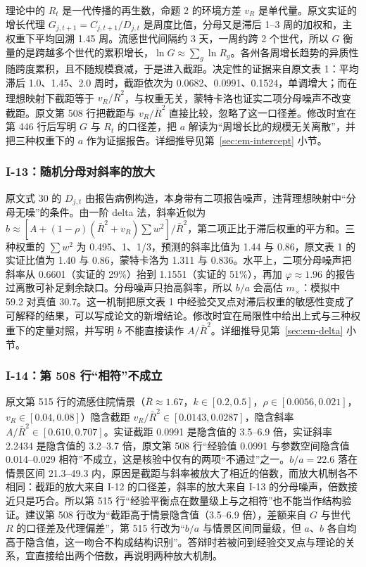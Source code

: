 理论中的 $R_t$ 是一代传播的再生数，命题 2 的环境方差 $v_R$ 是单代量。原文实证的增长代理 $G_{j,t+1}=C_{j,t+1}/\allowbreak D_{j,t}$ 是周度比值，分母又是滞后 1--3 周的加权和，主权重下平均回溯 1.45 周。流感世代间隔约 3 天，一周约跨 2 个世代，所以 $G$ 衡量的是跨越多个世代的累积增长，$\ln G\approx\sum_g\ln R_g$。各州各周增长趋势的异质性随跨度累积，且不随规模衰减，于是进入截距。决定性的证据来自原文表 1：平均滞后 1.0、1.45、2.0 周时，截距依次为 0.0682、0.0991、0.1524，单调增大；而在理想映射下截距等于 $v_R/\bar R^2$，与权重无关，蒙特卡洛也证实二项分母噪声不改变截距。原文第 508 行把截距与 $v_R/\bar R^2$ 直接比较，忽略了这一口径差。修改时宜在第 446 行后写明 $G$ 与 $R_t$ 的口径差，把 $a$ 解读为“周增长比的规模无关离散”，并把三种权重下的 $a$ 作为证据报告。详细推导见第~\ref{sec:em-intercept} 小节。

\subsubsection{I-13：随机分母对斜率的放大}

原文式 30 的 $D_{j,t}$ 由报告病例构造，本身带有二项报告噪声，违背理想映射中“分母无噪”的条件。由一阶 delta 法，斜率近似为 $b\approx[A+(1-\rho)(\bar R^2+v_R)\sum w^2]/\bar R^2$，第二项正比于滞后权重的平方和。三种权重的 $\sum w^2$ 为 0.495、1、1/3，预测的斜率比值为 1.44 与 0.86，原文表 1 的实证比值为 1.40 与 0.86，蒙特卡洛为 1.311 与 0.836。水平上，二项分母噪声把斜率从 0.6601（实证的 29\%）抬到 1.1551（实证的 51\%），再加 $\varphi\approx1.96$ 的报告过离散可补足剩余缺口。分母噪声只抬高斜率，所以 $b/a$ 会高估 $m_\times$：模拟中 59.2 对真值 30.7。这一机制把原文表 1 中经验交叉点对滞后权重的敏感性变成了可解释的结果，可以写成论文的新增结论。修改时宜在局限性中给出上式与三种权重下的定量对照，并写明 $b$ 不能直接读作 $A/\bar R^2$。详细推导见第~\ref{sec:em-delta} 小节。

\subsubsection{I-14：第 508 行“相符”不成立}

原文第 515 行的流感住院情景（$\bar R\approx1.67$，$k\in[0.2,0.5]$，$\rho\in[0.0056,0.021]$，$v_R\in[0.04,0.08]$）隐含截距 $v_R/\bar R^2\in[0.0143,0.0287]$，隐含斜率 $A/\bar R^2\in[0.610,0.707]$。实证截距 0.0991 是隐含值的 3.5--6.9 倍，实证斜率 2.2434 是隐含值的 3.2--3.7 倍，原文第 508 行“经验值 0.0991 与参数空间隐含值 0.014--0.029 相符”不成立，这是核验中仅有的两项“不通过”之一。$b/a=22.6$ 落在情景区间 21.3--49.3 内，原因是截距与斜率被放大了相近的倍数，而放大机制各不相同：截距的放大来自 I-12 的口径差，斜率的放大来自 I-13 的分母噪声，倍数接近只是巧合。所以第 515 行“经验平衡点在数量级上与之相符”也不能当作结构验证。建议第 508 行改为“截距高于情景隐含值（3.5--6.9 倍），差额来自 $G$ 与世代 $R$ 的口径差及代理偏差”，第 515 行改为“$b/a$ 与情景区间同量级，但 $a$、$b$ 各自均高于隐含值，这一吻合不构成结构识别”。答辩时若被问到经验交叉点与理论的关系，宜直接给出两个倍数，再说明两种放大机制。

